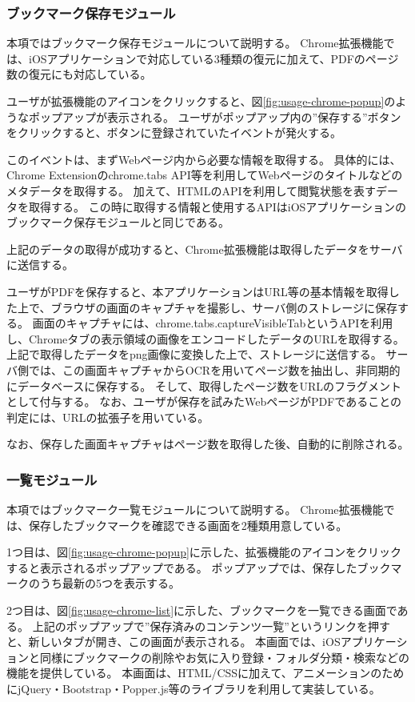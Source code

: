 \subsubsection{ブックマーク保存モジュール}
本項ではブックマーク保存モジュールについて説明する。
Chrome拡張機能では、iOSアプリケーションで対応している3種類の復元に加えて、PDFのページ数の復元にも対応している。

ユーザが拡張機能のアイコンをクリックすると、図\ref{fig:usage-chrome-popup}のようなポップアップが表示される。
ユーザがポップアップ内の”保存する”ボタンをクリックすると、ボタンに登録されていたイベントが発火する。

このイベントは、まずWebページ内から必要な情報を取得する。
具体的には、Chrome Extensionのchrome.tabs API等を利用してWebページのタイトルなどのメタデータを取得する。
加えて、HTMLのAPIを利用して閲覧状態を表すデータを取得する。
この時に取得する情報と使用するAPIはiOSアプリケーションのブックマーク保存モジュールと同じである。

上記のデータの取得が成功すると、Chrome拡張機能は取得したデータをサーバに送信する。

ユーザがPDFを保存すると、本アプリケーションはURL等の基本情報を取得した上で、ブラウザの画面のキャプチャを撮影し、サーバ側のストレージに保存する。
画面のキャプチャには、chrome.tabs.captureVisibleTabというAPIを利用し、Chromeタブの表示領域の画像をエンコードしたデータのURLを取得する。
上記で取得したデータをpng画像に変換した上で、ストレージに送信する。
サーバ側では、この画面キャプチャからOCRを用いてページ数を抽出し、非同期的にデータベースに保存する。
そして、取得したページ数をURLのフラグメントとして付与する。
なお、ユーザが保存を試みたWebページがPDFであることの判定には、URLの拡張子を用いている。

なお、保存した画面キャプチャはページ数を取得した後、自動的に削除される。

\subsubsection{一覧モジュール}
本項ではブックマーク一覧モジュールについて説明する。
Chrome拡張機能では、保存したブックマークを確認できる画面を2種類用意している。

1つ目は、図\ref{fig:usage-chrome-popup}に示した、拡張機能のアイコンをクリックすると表示されるポップアップである。
ポップアップでは、保存したブックマークのうち最新の5つを表示する。

2つ目は、図\ref{fig:usage-chrome-list}に示した、ブックマークを一覧できる画面である。
上記のポップアップで”保存済みのコンテンツ一覧”というリンクを押すと、新しいタブが開き、この画面が表示される。
本画面では、iOSアプリケーションと同様にブックマークの削除やお気に入り登録・フォルダ分類・検索などの機能を提供している。
本画面は、HTML/CSSに加えて、アニメーションのためにjQuery\cite{jquery}・Bootstrap\cite{bootstrap}・Popper.js\cite{popper}等のライブラリを利用して実装している。


